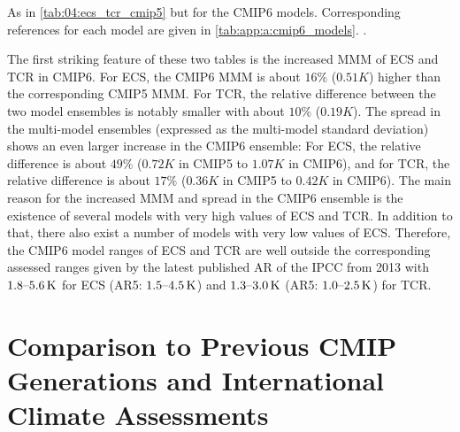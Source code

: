 \begin{table}[p]
  \centering
  \caption[
    As in \cref{tab:04:ecs_tcr_cmip5} but for the \acs{CMIP}6 models.
  ]{
    As in \cref{tab:04:ecs_tcr_cmip5} but for the \acs{CMIP}6 models.
    Corresponding references for each model are given in
    \cref{tab:app:a:cmip6_models}. .
  }
  \label{tab:04:ecs_tcr_cmip6}
\end{table}

The first striking feature of these two tables is the increased \ac{MMM} of
\ac{ECS} and \ac{TCR} in \acs{CMIP}6. For \ac{ECS}, the \acs{CMIP}6 \ac{MMM} is
about $16 \unit{\%}$ ($0.51 \unit{K}$) higher than the corresponding
\acs{CMIP}5 \ac{MMM}. For \ac{TCR}, the relative difference between the two
model ensembles is notably smaller with about $10 \unit{\%}$ ($0.19 \unit{K}$).
The spread in the multi-model ensembles (expressed as the multi-model standard
deviation) shows an even larger increase in the \acs{CMIP}6 ensemble: For
\ac{ECS}, the relative difference is about $49 \unit{\%}$ ($0.72 \unit{K}$ in
\acs{CMIP}5 to $1.07 \unit{K}$ in \acs{CMIP}6), and for \ac{TCR}, the relative
difference is about $17 \unit{\%}$ ($0.36 \unit{K}$ in \acs{CMIP}5 to $0.42
\unit{K}$ in \acs{CMIP}6). The main reason for the increased \ac{MMM} and
spread in the \acs{CMIP}6 ensemble is the existence of several models with very
high values of \ac{ECS} and \ac{TCR}. In addition to that, there also exist a
number of models with very low values of \ac{ECS}. Therefore, the \acs{CMIP}6
model ranges of \ac{ECS} and \ac{TCR} are well outside the corresponding
assessed ranges given by the latest published \ac{AR} of the \ac{IPCC} from
2013 \autocite{Stocker2013} with $\rangeunit{1.8}{5.6}{K}$ for \ac{ECS}
(\acs{AR}5: $\rangeunit{1.5}{4.5}{K}$) and $\rangeunit{1.3}{3.0}{K}$
(\acs{AR}5: $\rangeunit{1.0}{2.5}{K}$) for \ac{TCR}.


\section{Comparison to Previous \acs{CMIP} Generations and International
  Climate Assessments}
\label{sec:04:historical_context}


